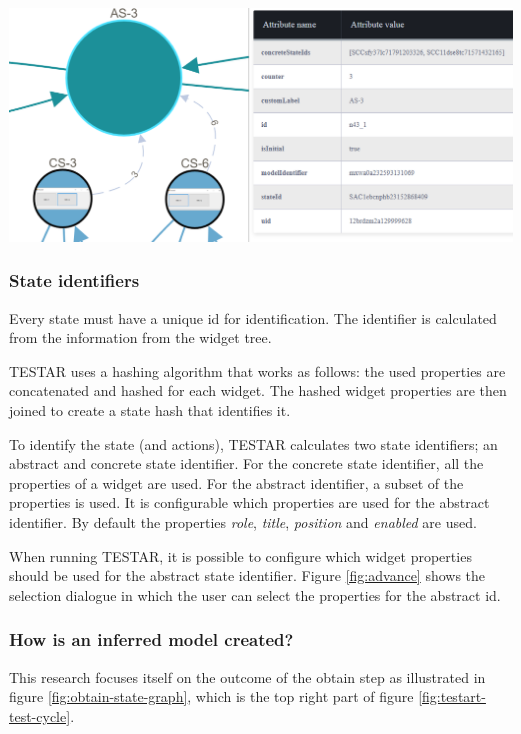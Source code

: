 \bigskip
\begingroup
\captionsetup{type=figure}
\includegraphics[scale=0.5]{document/pics/abstract-model.png}
\label{fig:abstract-model}
\endgroup

\subsubsection{State identifiers} \label{state-identifiers}
Every state must have a unique id for identification. The identifier is calculated from the information from the widget tree. 

TESTAR uses a hashing algorithm that works as follows: the used properties are concatenated and hashed for each widget. The hashed widget properties are then joined to create a state hash that identifies it. 

To identify the state (and actions), TESTAR calculates two state identifiers; an abstract and concrete state identifier. For the concrete state identifier, all the properties of a widget are used. For the abstract identifier, a subset of the properties is used. It is configurable which properties are used for the abstract identifier. By default the properties \textit{role}, \textit{title}, \textit{position} and \textit{enabled} are used.

When running TESTAR, it is possible to configure which widget properties should be used for the abstract state identifier. Figure \ref{fig:advance} shows the selection dialogue in which the user can select the properties for the abstract id.

\subsubsection{How is an inferred model created?}
This research focuses itself on the outcome of the obtain step as illustrated in figure \ref{fig:obtain-state-graph}, which is the top right part of figure \ref{fig:testart-test-cycle}.

